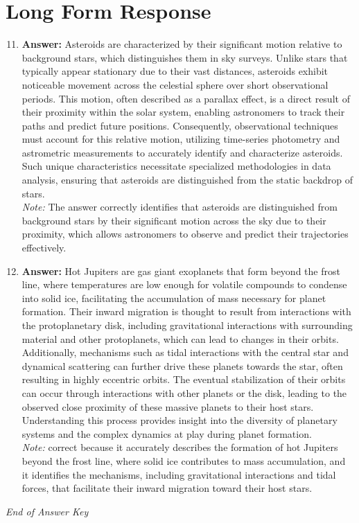 \documentclass[12pt]{article}
\begin{document}
\section*{Long Form Response}
\begin{enumerate}[label=\arabic*.]
\setcounter{enumi}{10}
\item \textbf{Answer:} Asteroids are characterized by their significant motion relative to background stars, which distinguishes them in sky surveys. Unlike stars that typically appear stationary due to their vast distances, asteroids exhibit noticeable movement across the celestial sphere over short observational periods. This motion, often described as a parallax effect, is a direct result of their proximity within the solar system, enabling astronomers to track their paths and predict future positions. Consequently, observational techniques must account for this relative motion, utilizing time-series photometry and astrometric measurements to accurately identify and characterize asteroids. Such unique characteristics necessitate specialized methodologies in data analysis, ensuring that asteroids are distinguished from the static backdrop of stars.
\\ \textit{Note:} The answer correctly identifies that asteroids are distinguished from background stars by their significant motion across the sky due to their proximity, which allows astronomers to observe and predict their trajectories effectively.
\item \textbf{Answer:} Hot Jupiters are gas giant exoplanets that form beyond the frost line, where temperatures are low enough for volatile compounds to condense into solid ice, facilitating the accumulation of mass necessary for planet formation. Their inward migration is thought to result from interactions with the protoplanetary disk, including gravitational interactions with surrounding material and other protoplanets, which can lead to changes in their orbits. Additionally, mechanisms such as tidal interactions with the central star and dynamical scattering can further drive these planets towards the star, often resulting in highly eccentric orbits. The eventual stabilization of their orbits can occur through interactions with other planets or the disk, leading to the observed close proximity of these massive planets to their host stars. Understanding this process provides insight into the diversity of planetary systems and the complex dynamics at play during planet formation.
\\ \textit{Note:} correct because it accurately describes the formation of hot Jupiters beyond the frost line, where solid ice contributes to mass accumulation, and it identifies the mechanisms, including gravitational interactions and tidal forces, that facilitate their inward migration toward their host stars.
\end{enumerate}

\vfill
\noindent\textit{End of Answer Key}
\end{document}
